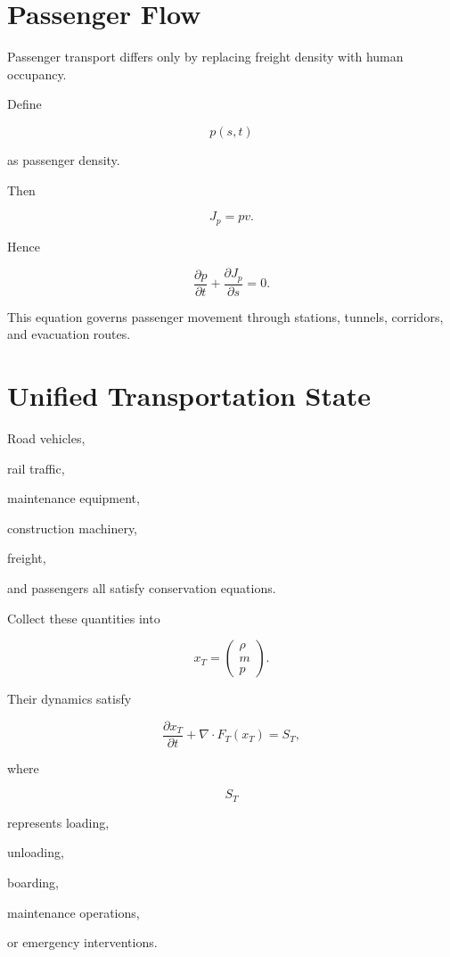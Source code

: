 \documentclass[11pt,fleqn]{book}
\numberwithin{equation}{chapter}
\theoremstyle{plain}
\theoremstyle{definition}
\theoremstyle{remark}
\begin{document}
\section{Passenger Flow}

Passenger transport differs only by replacing freight density with human
occupancy.

Define

\[
p(s,t)
\]

as passenger density.

Then

\[
J_p
=
pv.
\]

Hence

\[
\boxed{
\frac{\partial p}{\partial t}
+
\frac{\partial J_p}{\partial s}
=
0.
}
\]

This equation governs passenger movement through stations, tunnels,
corridors, and evacuation routes.


\section{Unified Transportation State}

Road vehicles,

rail traffic,

maintenance equipment,

construction machinery,

freight,

and passengers all satisfy conservation equations.

Collect these quantities into

\[
x_T
=
\begin{pmatrix}
\rho\\
m\\
p
\end{pmatrix}.
\]

Their dynamics satisfy

\[
\boxed{
\frac{\partial x_T}{\partial t}
+
\nabla\cdot
F_T(x_T)
=
S_T,
}
\]

where

\[
S_T
\]

represents loading,

unloading,

boarding,

maintenance operations,

or emergency interventions.

\end{document}

